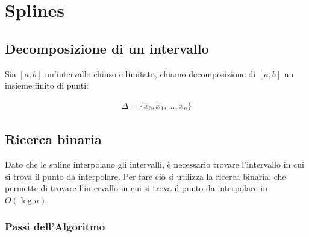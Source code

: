 \chapter{Splines}


\section{Decomposizione di un intervallo}
Sia $[a, b]$ un'intervallo chiuso e limitato, chiamo decomposizione di $[a, b]$ un insieme finito di punti:

\begin{align}
  \Delta = \{x_0, x_1, \dots, x_n\}
\end{align}



\section{Ricerca binaria}
Dato che le spline interpolano gli intervalli, è necessario trovare l'intervallo in cui si trova il punto da interpolare. Per fare ciò si utilizza la ricerca binaria, che permette di trovare l'intervallo in cui si trova il punto da interpolare in $O(\log n)$.

\subsection{Passi dell'Algoritmo}

